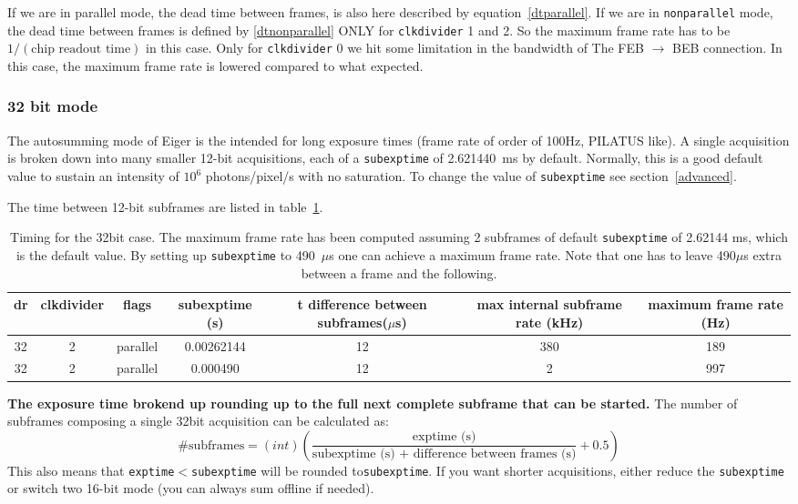 \documentclass{article}
\begin{document}
{{{If we are in parallel mode, the dead time between frames, is also here described by equation~\ref{dtparallel}. If we are in {\tt{nonparallel}} mode, the dead time between frames is defined by \ref{dtnonparallel} ONLY for {\tt{clkdivider}} 1 and 2. So the maximum frame rate has to be $1/(\textrm{chip readout time})$ in this case. Only for {\tt{clkdivider}} 0 we hit some limitation in the bandwidth of The FEB $\to$ BEB connection. In this case, the maximum frame rate is lowered compared to what expected.

\subsubsection{32 bit mode}
The autosumming mode of Eiger is the intended for long exposure times (frame rate of order of 100Hz, PILATUS like). A single acquisition is broken down into many smaller 12-bit acquisitions, each of a {\tt{subexptime}} of 2.621440~ms by default. Normally, this is a good default value to sustain an intensity of $10^6$ photons/pixel/s with no saturation. To change the value of {\tt{subexptime}} see section~\ref{advanced}. 

The time between 12-bit subframes are listed in table~\ref{t32bitframe}.  
\begin{tiny}
\begin{table}
\begin{flushleft}
\begin{tabular}{|c|c|c|c|c|c|c|}
\hline
\tiny{dr} & \tiny{clkdivider} & \tiny{flags} & \tiny{subexptime (s)} & \tiny{t difference between subframes($\mu$s)} & \tiny{max internal subframe rate (kHz)} & \tiny{maximum frame rate (Hz)}\\
\hline
32 & 2 & parallel & 0.00262144 & 12 & 380 & 189\\
\hline
32 & 2 & parallel & 0.000490 & 12 & 2 & 997\\
\hline
\end{tabular}
\caption{Timing for the 32bit case. The maximum frame rate has been computed assuming 2 subframes of default {\tt{subexptime}} of 2.62144 ms, which is the default value. By setting up {\tt{subexptime}} to 490~$\mu$s one can achieve a maximum frame rate. Note that one has to leave 490$\mu$s extra between a frame and the following.}
\label{t32bitframe}
\end{flushleft}
\end{table}
\end{tiny}

\textbf{The exposure time brokend up rounding up to the full next complete subframe that can be started.}
The number of subframes composing a single 32bit acquisition can be calculated as:
\begin{equation}
\textrm{\# subframes}= (int) (\frac{\textrm{exptime (s)}}{\textrm{subexptime (s) + difference between frames (s)}}+0.5)
\end{equation}
This also means that {\tt{exptime}}$<${\tt{subexptime}} will be rounded to{\tt{subexptime}}. If you want shorter acquisitions, either reduce the {\tt{subexptime}} or switch two 16-bit mode (you can always sum offline if needed).   

}}}
\end{document}
